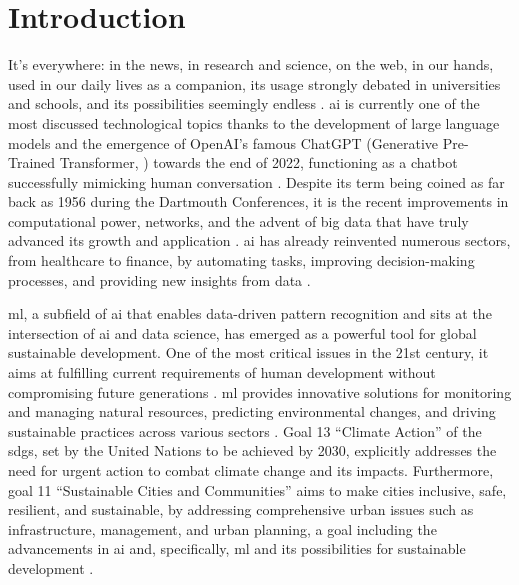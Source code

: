\chapter{Introduction}
\label{sec:intro}

It's everywhere: in the news, in research and science, on the web, in our hands, used in our daily lives as a companion, its usage strongly debated in universities and schools, and its possibilities seemingly endless \autocite{Roumeliotis.Tselikas2023}. \gls{ai} is currently one of the most discussed technological topics thanks to the development of large language models and the emergence of {\nobreak OpenAI's} famous ChatGPT (Generative Pre-Trained Transformer, \autocite{OpenAI2022}) towards the end of 2022, functioning as a chatbot successfully mimicking human conversation \autocite{Abdullah.Madain.ea2022,Alzubaidi.Zhang.ea2021}. Despite its term being coined as far back as 1956 during the Dartmouth Conferences, it is the recent improvements in computational power, networks, and the advent of big data that have truly advanced its growth and application \autocite{Ongsulee2017}. \gls{ai} has already reinvented numerous sectors, from healthcare to finance, by automating tasks, improving decision-making processes, and providing new insights from data \autocite{Alzubaidi.Zhang.ea2021,Bini2018,Ongsulee2017,Roumeliotis.Tselikas2023}.

\gls{ml}, a subfield of \gls{ai} that enables data-driven pattern recognition and sits at the intersection of \gls{ai} and data science, has emerged as a powerful tool for global sustainable development. One of the most critical issues in the 21st century, it aims at fulfilling current requirements of human development without compromising future generations \autocite{UnitedNations2023}. \gls{ml} provides innovative solutions for monitoring and managing natural resources, predicting environmental changes, and driving sustainable practices across various sectors \autocite{Getzner.Charpentier.ea2023,Kar.Choudhary.ea2022,Mehlin.Schacht.ea2023}. Goal 13 \enquote{Climate Action} of the \glspl{sdg}, set by the United Nations to be achieved by 2030, explicitly addresses the need for urgent action to combat climate change and its impacts. Furthermore, goal 11 \enquote{Sustainable Cities and Communities} aims to make cities inclusive, safe, resilient, and sustainable, by addressing comprehensive urban issues such as infrastructure, management, and urban planning, a goal including the advancements in \gls{ai} and, specifically, \gls{ml} and its possibilities for sustainable development \autocite{UnitedNations2023}.


